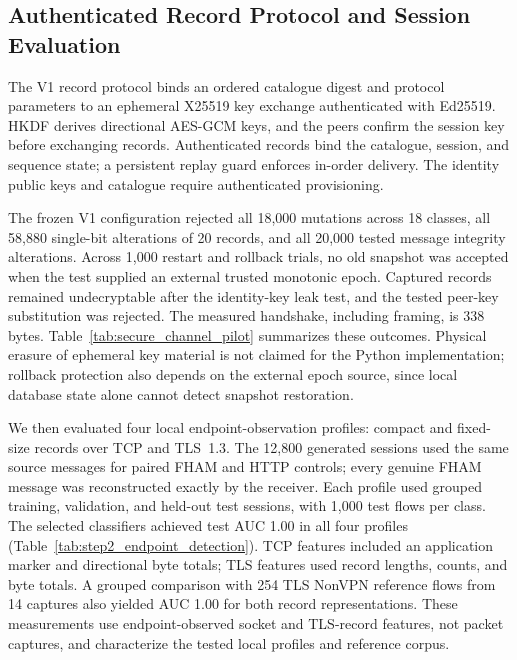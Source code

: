 \documentclass[preprint,12pt]{elsarticle}
\theoremstyle{plain}
\begin{document}
\subsection{Authenticated Record Protocol and Session Evaluation}
\label{sec:step2_security}

The V1 record protocol binds an ordered catalogue digest and protocol
parameters to an ephemeral X25519 key exchange authenticated with Ed25519.
HKDF derives directional AES-GCM keys, and the peers confirm the session key
before exchanging records. Authenticated records bind the catalogue, session,
and sequence state; a persistent replay guard enforces in-order delivery.
The identity public keys and catalogue require authenticated provisioning.

The frozen V1 configuration rejected all 18,000 mutations across 18 classes,
all 58,880 single-bit alterations of 20 records, and all 20,000 tested message
integrity alterations. Across 1,000 restart and rollback trials, no old
snapshot was accepted when the test supplied an external trusted monotonic
epoch. Captured records remained undecryptable after the identity-key leak
test, and the tested peer-key substitution was rejected. The measured
handshake, including framing, is 338 bytes. Table~\ref{tab:secure_channel_pilot}
summarizes these outcomes. Physical erasure of ephemeral key material is not
claimed for the Python implementation; rollback protection also depends on
the external epoch source, since local database state alone cannot detect
snapshot restoration.

We then evaluated four local endpoint-observation profiles: compact and
fixed-size records over TCP and TLS~1.3. The 12,800 generated sessions used
the same source messages for paired FHAM and HTTP controls; every genuine
FHAM message was reconstructed exactly by the receiver. Each profile used
grouped training, validation, and held-out test sessions, with 1,000 test
flows per class. The selected classifiers achieved test AUC 1.00 in all four
profiles (Table~\ref{tab:step2_endpoint_detection}). TCP features included
an application marker and directional byte totals; TLS features used record
lengths, counts, and byte totals. A grouped comparison with 254 TLS NonVPN
reference flows from 14 captures also yielded AUC 1.00 for both record
representations. These measurements use endpoint-observed socket and
TLS-record features, not packet captures, and characterize the tested local
profiles and reference corpus.

\begin{table}[!t]
\centering
\small
\caption{V1 authenticated-record and session-security test outcomes.}
\label{tab:secure_channel_pilot}

\end{table}
\end{document}

